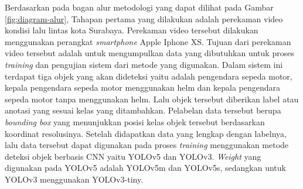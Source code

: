 Berdasarkan pada bagan alur metodologi yang dapat dilihat pada Gambar \ref{fig:diagram-alur}, Tahapan pertama yang dilakukan adalah
perekaman video kondisi lalu lintas kota Surabaya. Perekaman video tersebut dilakukan menggunakan perangkat \emph{smartphone} Apple Iphone XS.
Tujuan dari perekaman video tersebut adalah untuk mengumpulkan data yang dibutuhkan untuk proses \emph{training} dan pengujian sistem dari metode yang digunakan.
Dalam sistem ini terdapat tiga objek yang akan dideteksi yaitu adalah pengendara sepeda motor, kepala pengendara sepeda motor menggunakan helm dan kepala pengendara 
sepeda motor tanpa menggunakan helm. Lalu objek tersebut diberikan label atau anotasi yang sesuai kelas yang ditambahkan. Pelabelan data tersebut berupa
\emph{bounding box} yang menunjukkan posisi kelas objek tersebut berdasarkan koordinat resolusinya. Setelah didapatkan data yang lengkap dengan labelnya, lalu data tersebut dapat digunakan
pada proses \emph{training} menggunakan metode deteksi objek berbasis CNN yaitu YOLOv5 dan YOLOv3. \emph{Weight} yang digunakan pada YOLOv5 adalah YOLOv5m dan YOLOv5s, sedangkan
untuk YOLOv3 menggunakan YOLOv3-tiny.
